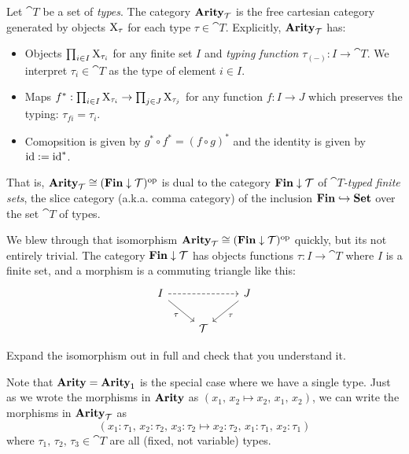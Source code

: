 \documentclass[DynamicalBook]{subfiles}
\begin{document}
\begin{definition}
  Let $\cat{T}$ be a set of \emph{types}. The category $\textbf{Arity}_{\mathcal{T}}$ is the
  free cartesian category generated by objects $\mathrm{X}_{\tau}$ for each type $\tau
  \in \cat{T}$. Explicitly, $\textbf{Arity}_{\mathcal{T}}$ has:
  \begin{itemize}
    \item Objects $\prod_{i \in I} \mathrm{X}_{\tau_i}$ for any finite set $I$ and
      \emph{typing function}
      $\tau_{(-)} : I \to \cat{T}$. We interpret $\tau_i \in \cat{T}$ as the
      type of element $i \in I$.
    \item Maps $f^{\ast} : \prod_{i \in I} \mathrm{X}_{\tau_i} \to
      \prod_{j \in J} \mathrm{X}_{\tau_j}$ for any function $f : I \to J$ which
      preserves the typing: $\tau_{fi} = \tau_i$.
    \item Comopsition is given by $g^{\ast} \circ f^{\ast} = (f \circ g)^{\ast}$
      and the identity is given by $\mathrm{id} := \mathrm{id}^{\ast}$. 
  \end{itemize}
  That is, $\textbf{Arity}_{\mathcal{T}} \cong (\textbf{Fin} \downarrow \mathcal{T})^{\textnormal{op}}$ is dual to
  the category
  $\textbf{Fin} \downarrow \mathcal{T}$ of \emph{$\cat{T}$-typed finite sets}, the slice category (a.k.a. comma category)
  of the inclusion $\textbf{Fin} \hookrightarrow \textbf{Set}$ over the set $\cat{T}$
  of types. 
\end{definition}

\begin{exercise}
  We blew through that isomorphism $\textbf{Arity}_{\mathcal{T}} \cong (\textbf{Fin} \downarrow
  \mathcal{T})^{\textnormal{op}}$ quickly, but its not entirely trivial. The category $\textbf{Fin} \downarrow
  \mathcal{T}$ has objects functions $\tau : I \to \cat{T}$ where $I$ is a finite
  set, and a morphism is a commuting triangle like this:
  \[
    \begin{tikzcd}
      I \ar[rr, dashed] \ar[dr, "\tau"'] & & J \ar[dl, "\tau"] \\
      & \cat{T} &
    \end{tikzcd}
  \]


  Expand the isomorphism out in full and check
  that you understand it.
\end{exercise}

Note that $\textbf{Arity} = \textbf{Arity}_{\mathsf{1}}$ is the special case where we have a single
type. Just as we wrote the morphisms in $\textbf{Arity}$ as $(x_1,\, x_2 \mapsto x_2,\,
x_1,\, x_2)$, we can write the morphisms in $\textbf{Arity}_{\mathcal{T}}$ as
$$(x_1 : \tau_1,\, x_2 : \tau_2,\, x_3 : \tau_2 \mapsto x_2 : \tau_2,\, x_1 :
\tau_1,\, x_2 : \tau_1)$$
where $\tau_1,\, \tau_2,\, \tau_3 \in \cat{T}$ are all (fixed, not variable) types.
\end{document}
